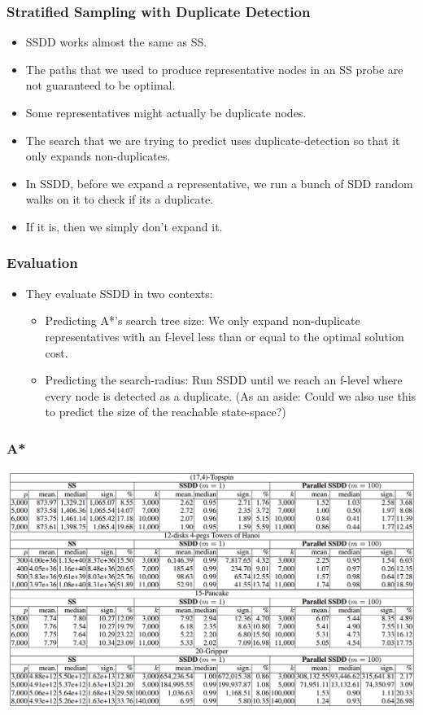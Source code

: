 \documentclass{beamer}
\begin{document}
\begin{frame}
  \frametitle{Stratified Sampling with Duplicate Detection}
  \begin{itemize}
  \item SSDD works almost the same as SS.
  \item The paths that we used to produce representative nodes in an SS probe are not guaranteed to be optimal.
  \item Some representatives might actually be duplicate nodes.
  \item The search that we are trying to predict uses duplicate-detection so that it only expands non-duplicates.
  \item In SSDD, before we expand a representative, we run a bunch of SDD random walks on it to check if its a duplicate.
  \item If it is, then we simply don't expand it.
  \end{itemize}
\end{frame}

\begin{frame}
  \frametitle{Evaluation}
  \begin{itemize}
  \item They evaluate SSDD in two contexts:
    \begin{itemize}
    \item Predicting A*'s search tree size:
      We only expand non-duplicate representatives with an f-level less than or equal to the optimal solution cost.
    \item Predicting the search-radius: Run SSDD until we reach an f-level where every node is detected as a duplicate.
      (As an aside: Could we also use this to predict the size of the reachable state-space?)
    \end{itemize}
  
  
  \end{itemize}
\end{frame}

\begin{frame}
  \frametitle{A*}
  \includegraphics[scale=0.36]{lelis_fig2.png}
\end{frame}
\end{document}
